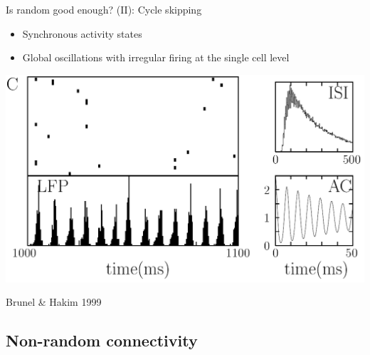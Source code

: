 \documentclass[fleqn]{beamer}
\newcommand{\ppc}[1]{\pause\setcounter{page}{#1}}
\begin{document}
\begin{frame}{Is random good enough? (II): Cycle skipping}
\begin{itemize}
    \item Synchronous activity states \ppc{4}
    \item Global oscillations with irregular firing at the single cell level
  \end{itemize}\ppc{4}
  \begin{center}
    \includegraphics[width=.6\textwidth]{figures/brunel2.png}
  \end{center}
  \begin{flushright}
    {\footnotesize Brunel \& Hakim 1999}
   \end{flushright}
\end{frame}

\subsection{Non-random connectivity}
\end{document}
